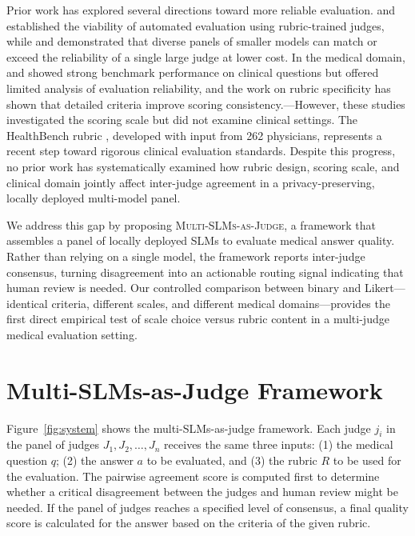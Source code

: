 \documentclass[11pt]{article}
\begin{document}
Prior work has explored several directions toward more reliable evaluation. \citet{zheng2023judging} and \citet{kim2024prometheus} established the viability of automated evaluation using rubric-trained judges, while \citet{verga2024replacing} and \citet{chan2023chateval} demonstrated that diverse panels of smaller models can match or exceed the reliability of a single large judge at lower cost. In the medical domain, \citet{singhal2023large} and \citet{nori2023gpt4} showed strong benchmark performance on clinical questions but offered limited analysis of evaluation reliability, and the work on rubric specificity \citep{liu2024calibrating,shen2023large} has shown that detailed criteria improve scoring consistency.—However, these studies investigated the scoring scale but did not examine clinical settings. The HealthBench rubric \citep{arora2025healthbench}, developed with input from 262 physicians, represents a recent step toward rigorous clinical evaluation standards. Despite this progress, no prior work has systematically examined how rubric design, scoring scale, and clinical domain jointly affect inter-judge agreement in a privacy-preserving, locally deployed multi-model panel.

We address this gap by proposing \textsc{Multi-SLMs-as-Judge}, a framework that assembles a panel of locally deployed SLMs to evaluate medical answer quality. Rather than relying on a single model, the framework reports inter-judge consensus, turning disagreement into an actionable routing signal indicating that human review is needed. Our controlled comparison between binary and Likert—identical criteria, different scales, and different medical domains—provides the first direct empirical test of scale choice versus rubric content in a multi-judge medical evaluation setting.



\section{Multi-SLMs-as-Judge Framework}



Figure~\ref{fig:system} shows the multi-SLMs-as-judge framework. Each
judge $j_i$ in the panel of judges $J_1, J_2, \ldots, J_n$ receives the same three inputs: (1) the medical question
$q$; (2) the answer $a$ to be evaluated, and (3) the rubric $R$ to be used for the evaluation. The pairwise agreement score is computed first to determine whether a critical disagreement between the judges and human review might be needed. If the panel of judges reaches a specified level of consensus, a final quality score is calculated for the answer based on the criteria of the given rubric.
\end{document}
